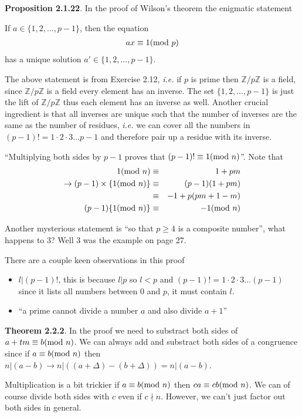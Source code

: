 \documentclass[aps,preprint,preprintnumbers,nofootinbib,showpacs,prd]{revtex4-1}
\newcommand{\ie}{{\it i.e.} }
\newcommand{\bit}{\begin{itemize}}
\newcommand{\eit}{\end{itemize}}
\newcommand{\nbea}{\begin{eqnarray*}}
\newcommand{\neea}{\end{eqnarray*}}
\begin{document}
{\bf Proposition 2.1.22}. In the proof of Wilson's theorem the enigmatic statement

If $a \in \{1, 2, . . . , p - 1\}$, then the equation
%
\nbea
ax \equiv 1 ({\rm mod~} p)
\neea
%
has a unique solution $a' \in \{1, 2, . . . , p - 1\}$. 

The above statement is from Exercise 2.12, \ie if $p$ is prime then $\mathbb{Z}/p\mathbb{Z}$ is a field, since $\mathbb{Z}/p\mathbb{Z}$ is a field every element has an inverse. The set $\{1, 2, . . . , p - 1\}$ is just the lift of $\mathbb{Z}/p\mathbb{Z}$ thus each element has an inverse as well. Another crucial ingredient is that all inverses are unique such that the number of inverses are the same as the number of residues, \ie we can cover all the numbers in $(p-1)! = 1\cdot 2\cdot 3 \dots p-1$ and therefore pair up a residue with its inverse.

``Multiplying both sides by $p-1$ proves that $(p-1)! \equiv 1 ({\rm mod~} n)$''. Note that
%
\nbea
1 ({\rm mod~} n) & \equiv & 1 + pm \\
\to (p-1) \times \{1 ({\rm mod~} n)\} & \equiv & (p-1)(1 + pm) \\
& \equiv & -1 + p(pm + 1 - m) \\
(p-1) \{1 ({\rm mod~} n)\} & \equiv & -1 ({\rm mod~}n)
\neea
%

Another mysterious statement is ``so that $p \ge 4$ is a composite number'', what happens to 3? Well 3 was the example on page 27.

There are a couple keen observations in this proof
\bit
\item $l|(p-1)!$, this is because $l|p$ so $l < p$ and $(p-1)! = 1\cdot 2\cdot 3 \dots (p-1)$ since it lists all numbers between 0 and $p$, it must contain $l$.
\item ``a prime cannot divide a number $a$ and also divide $a+1$''
\eit

{\bf Theorem 2.2.2}. In the proof we need to substract both sides of $a + tm \equiv b ({\rm mod~} n)$. We can always add and substract both sides of a congruence since if $a \equiv b ({\rm mod~} n)$ then $n|(a-b) \to n|((a+\Delta) - (b + \Delta)) = n|(a-b)$.

Multiplication is a bit trickier if $a \equiv b ({\rm mod~}n)$ then $ca \equiv cb ({\rm mod~}n)$. We can of course divide both sides with $c$ even if $c \nmid n$. However, we can't just factor out both sides in general.
\end{document}
